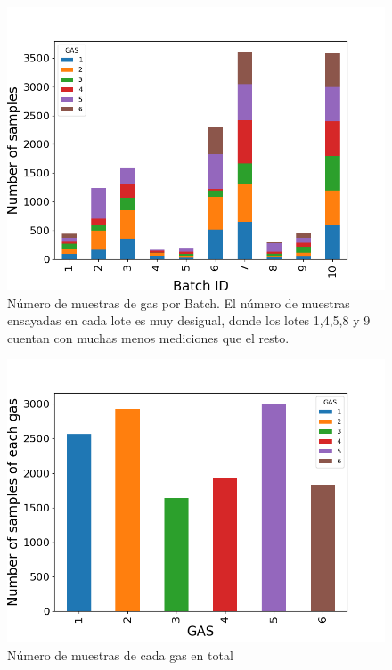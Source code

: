 \begin{figure}[ht!]
	\centering
	\includegraphics[width=\columnwidth]{../py_imgs/Step0_Count_Batch_Gas.png}
	\caption{Número de muestras de gas por Batch. El número de muestras ensayadas en cada lote es muy desigual, donde los lotes 1,4,5,8 y 9 cuentan con muchas menos mediciones que el resto. }
	\label{fig: gasBatchCount}
\end{figure}

\begin{figure}[ht!]
	\centering
	\includegraphics[width=\columnwidth]{../py_imgs/Step0_Count_Gas.png}
	\caption{Número de muestras de cada gas en total}
	\label{fig: gasCount}
\end{figure}

